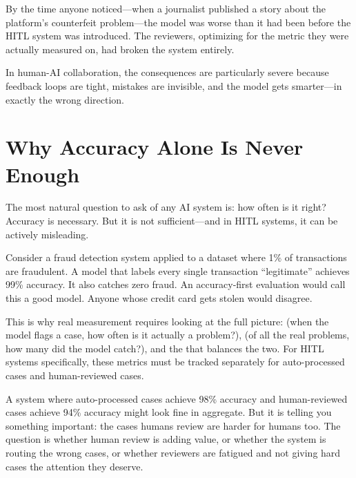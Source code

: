 By the time anyone noticed---when a journalist published a story about the platform's counterfeit problem---the model was worse than it had been before the HITL system was introduced. The reviewers, optimizing for the metric they were actually measured on, had broken the system entirely.

\begin{cautionbox}
In human-AI collaboration, the consequences are particularly severe because feedback loops are tight, mistakes are invisible, and the model gets smarter---in exactly the wrong direction.
\end{cautionbox}

\section{Why Accuracy Alone Is Never Enough}

The most natural question to ask of any AI system is: how often is it right? Accuracy is necessary. But it is not sufficient---and in HITL systems, it can be actively misleading.

Consider a fraud detection system applied to a dataset where 1\% of transactions are fraudulent. A model that labels every single transaction ``legitimate'' achieves 99\% accuracy. It also catches zero fraud. An accuracy-first evaluation would call this a good model. Anyone whose credit card gets stolen would disagree.

This is why real measurement requires looking at the full picture:  (when the model flags a case, how often is it actually a problem?),  (of all the real problems, how many did the model catch?), and the  that balances the two. For HITL systems specifically, these metrics must be tracked separately for auto-processed cases and human-reviewed cases.

A system where auto-processed cases achieve 98\% accuracy and human-reviewed cases achieve 94\% accuracy might look fine in aggregate. But it is telling you something important: the cases humans review are harder for humans too. The question is whether human review is adding value, or whether the system is routing the wrong cases, or whether reviewers are fatigued and not giving hard cases the attention they deserve.

